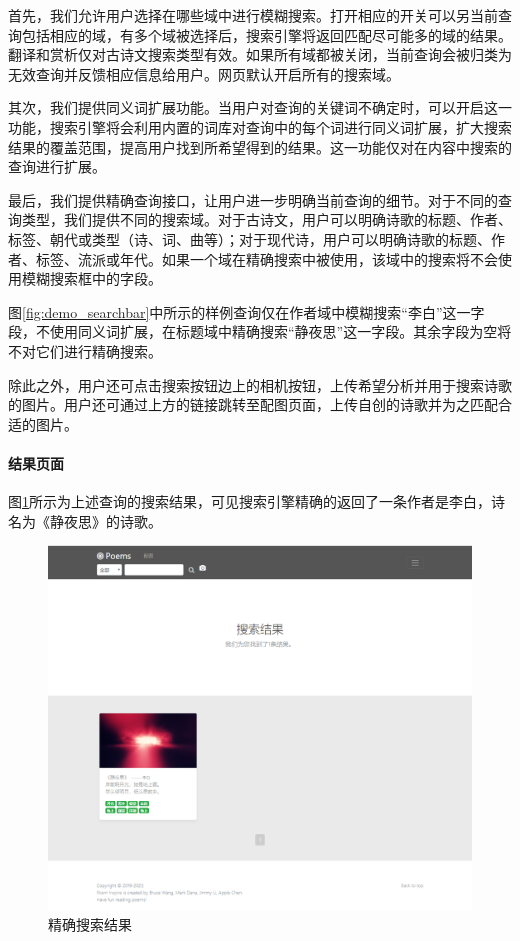 \documentclass[a4paper, 10pt]{article}
\begin{document}
首先，我们允许用户选择在哪些域中进行模糊搜索。打开相应的开关可以另当前查询包括相应的域，有多个域被选择后，搜索引擎将返回匹配尽可能多的域的结果。翻译和赏析仅对古诗文搜索类型有效。如果所有域都被关闭，当前查询会被归类为无效查询并反馈相应信息给用户。网页默认开启所有的搜索域。

其次，我们提供同义词扩展功能。当用户对查询的关键词不确定时，可以开启这一功能，搜索引擎将会利用内置的词库对查询中的每个词进行同义词扩展，扩大搜索结果的覆盖范围，提高用户找到所希望得到的结果。这一功能仅对在内容中搜索的查询进行扩展。

最后，我们提供精确查询接口，让用户进一步明确当前查询的细节。对于不同的查询类型，我们提供不同的搜索域。对于古诗文，用户可以明确诗歌的标题、作者、标签、朝代或类型（诗、词、曲等）；对于现代诗，用户可以明确诗歌的标题、作者、标签、流派或年代。如果一个域在精确搜索中被使用，该域中的搜索将不会使用模糊搜索框中的字段。

图\ref{fig:demo_searchbar}中所示的样例查询仅在作者域中模糊搜索“李白”这一字段，不使用同义词扩展，在标题域中精确搜索“静夜思”这一字段。其余字段为空将不对它们进行精确搜索。

除此之外，用户还可点击搜索按钮边上的相机按钮，上传希望分析并用于搜索诗歌的图片。用户还可通过上方的链接跳转至配图页面，上传自创的诗歌并为之匹配合适的图片。


\paragraph*{结果页面} 图\ref{fig:demo_accres}所示为上述查询的搜索结果，可见搜索引擎精确的返回了一条作者是李白，诗名为《静夜思》的诗歌。

\begin{figure}[H]
\centering
\includegraphics[scale=0.48]{fig/demo_accres.png}
\caption{精确搜索结果}
\label{fig:demo_accres}
\end{figure}
\end{document}
